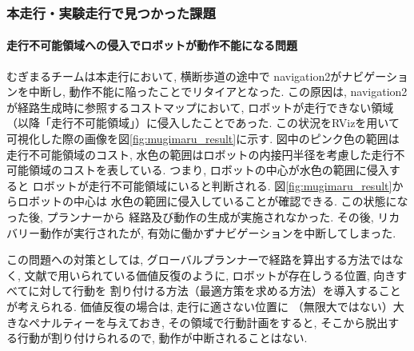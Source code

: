 \subsubsection{本走行・実験走行で見つかった課題}
\paragraph{走行不可能領域への侵入でロボットが動作不能になる問題}
むぎまるチームは本走行において, 横断歩道の途中で
navigation2がナビゲーションを中断し, 
動作不能に陥ったことでリタイアとなった. 
この原因は, navigation2が経路生成時に参照するコストマップにおいて, 
ロボットが走行できない領域（以降「走行不可能領域」）に侵入したことであった. 
この状況をRVizを用いて可視化した際の画像を図\ref{fig:mugimaru_result}に示す. 
図中のピンク色の範囲は走行不可能領域のコスト, 
水色の範囲はロボットの内接円半径を考慮した走行不可能領域のコストを表している. 
つまり, ロボットの中心が水色の範囲に侵入すると
ロボットが走行不可能領域にいると判断される. 
図\ref{fig:mugimaru_result}からロボットの中心は
水色の範囲に侵入していることが確認できる. 
この状態になった後, プランナーから
経路及び動作の生成が実施されなかった. 
その後, リカバリー動作が実行されたが, 
有効に働かずナビゲーションを中断してしまった. 

この問題への対策としては, 
グローバルプランナーで経路を算出する方法ではなく, 
文献\cite{ueda2023JRM}で用いられている価値反復のように, 
ロボットが存在しうる位置, 向きすべてに対して行動を
割り付ける方法（最適方策を求める方法）を導入することが考えられる. 
価値反復の場合は, 走行に適さない位置に
（無限大ではない）大きなペナルティーを与えておき, 
その領域で行動計画をすると, 
そこから脱出する行動が割り付けられるので, 
動作が中断されることはない. 




